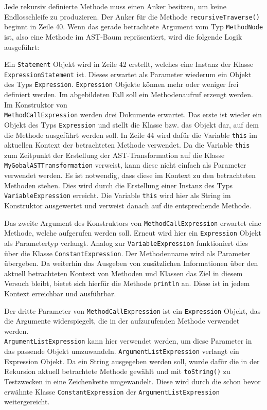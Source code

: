 Jede rekursiv definierte Methode muss einen Anker besitzen, um keine Endlosschleife zu produzieren. Der Anker für die Methode \texttt{recursiveTraverse()} beginnt in Zeile 40. Wenn das gerade betrachtete Argument vom Typ \texttt{MethodNode} ist, also eine Methode im AST-Baum repräsentiert, wird die folgende Logik ausgeführt:

Ein \texttt{Statement} Objekt wird in Zeile 42 erstellt, welches eine Instanz der Klasse \\ \texttt{ExpressionStatement} ist. 
Dieses erwartet als Parameter wiederum ein Objekt des Typs \texttt{Expression}. 
\texttt{Expression} Objekte können mehr oder weniger frei definiert werden.
Im abgebildeten Fall soll ein Methodenaufruf erzeugt werden. 
Im Konstruktor von \\ \texttt{MethodCallExpression} werden drei Dokumente erwartet. 
Das erste ist wieder ein Objekt des Typs \texttt{Expression} und stellt die Klasse bzw. das Objekt dar, auf dem die Methode ausgeführt werden soll. 
In Zeile 44 wird dafür die Variable \texttt{this} im aktuellen Kontext der betrachteten Methode verwendet. 
Da die Variable \texttt{this} zum Zeitpunkt der Erstellung der AST-Transformation auf die Klasse \texttt{MyGobalASTTransformation} verweist, kann diese nicht einfach als Parameter verwendet werden. 
Es ist notwendig, dass diese im Kontext zu den betrachteten Methoden stehen. 
Dies wird durch die Erstellung einer Instanz des Typs \texttt{VariableExpression} erreicht. 
Die Variable \texttt{this} wird hier als String im Konstruktor ausgewertet und verweist danach auf die entsprechende Methode. 

Das zweite Argument des Konstruktors von \texttt{MethodCallExpression} erwartet eine Methode, welche aufgerufen werden soll. 
Erneut wird hier ein \texttt{Expression} Objekt als Parametertyp verlangt. 
Analog zur \texttt{VariableExpression} funktioniert dies über die Klasse \texttt{ConstantExpression}. 
Der Methodenname wird als Parameter übergeben. Da weiterhin das Ausgeben von zusätzlichen Informationen über den aktuell betrachteten Kontext von Methoden und Klassen das Ziel in diesem Versuch bleibt, bietet sich hierfür die Methode \texttt{println} an. 
Diese ist in jedem Kontext erreichbar und ausführbar. 

Der dritte Parameter von \texttt{MethodCallExpression} ist ein \texttt{Expression} Objekt, das die Argumente widerspiegelt, die in der aufzurufenden Methode verwendet werden. \\ \texttt{ArgumentListExpression} kann hier verwendet werden, um diese Parameter in das passende Objekt umzuwandeln. \texttt{ArgumentListExpression} verlangt ein Expression Objekt. 
Da ein String ausgegeben werden soll, wurde dafür die in der Rekursion aktuell betrachtete Methode gewählt und mit \texttt{toString()} zu Testzwecken in eine Zeichenkette umgewandelt. 
Diese wird durch die schon bevor erwähnte Klasse \texttt{ConstantExpression} der \texttt{ArgumentListExpression} weitergereicht.

